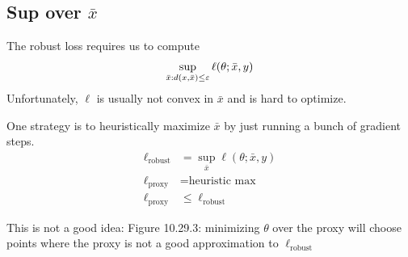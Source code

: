 \subsection{Sup over $\bar{x}$}%

The robust loss requires us to compute
\begin{align}
  \sup_{\bar{x} : d(x,\bar{x}) \leq \varepsilon} \ell(\theta; \bar{x}, y)
\end{align}
Unfortunately, $\ell$ is usually not convex in $\bar{x}$
and is hard to optimize.

One strategy is to heuristically maximize $\bar{x}$ by just running a bunch
of gradient steps.
\begin{align}
  \ell_{\text{robust}} &= \sup_{\bar{x}} \ell(\theta; \bar{x}, y) \\
  \ell_{\text{proxy}} &= \text{heuristic max} \\
  \ell_{\text{proxy}} &\leq \ell_{\text{robust}}
\end{align}

This is not a good idea: Figure 10.29.3: minimizing $\theta$ over
the proxy will choose points where the proxy is not a good approximation
to $\ell_{\text{robust}}$






